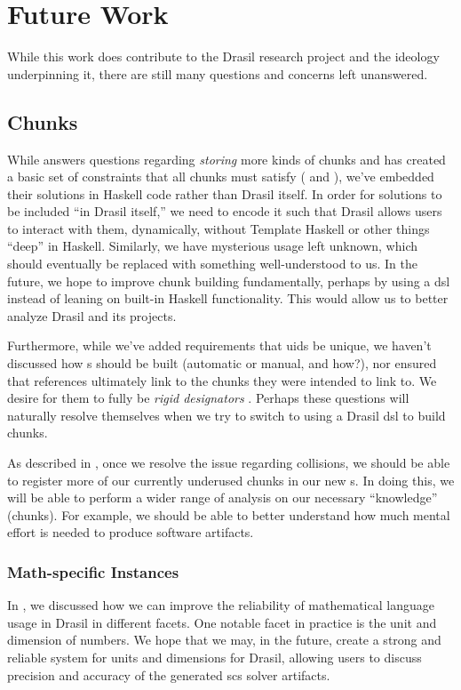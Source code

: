 \chapter{Future Work}
\label{chap:futureWork}


While this work does contribute to the Drasil research project and the ideology
underpinning it, there are still many questions and concerns left unanswered.

\section{Chunks}

While  answers questions regarding \textit{storing}
more kinds of chunks and has created a basic set of constraints that all chunks
must satisfy (\HasUID{} and \HasChunkRefs{}), we've embedded their solutions in
Haskell code rather than Drasil itself. In order for solutions to be included
``in Drasil itself,'' we need to encode it such that Drasil allows users to
interact with them, dynamically, without Template Haskell  or other things ``deep'' in Haskell. Similarly, we have
mysterious \Typeable{} usage left unknown, which should eventually be replaced
with something well-understood to us. In the future, we hope to improve chunk
building fundamentally, perhaps by using a \acs{dsl} instead of leaning on
built-in Haskell functionality. This would allow us to better analyze Drasil and
its projects.

Furthermore, while we've added requirements that \acsp{uid} be unique, we
haven't discussed how \UID{}s should be built (automatic or manual, and how?),
nor ensured that \UID{} references ultimately link to the chunks they were
intended to link to. We desire for them to fully be \textit{rigid designators}
. Perhaps these questions will
naturally resolve themselves when we try to switch to using a Drasil \acs{dsl}
to build chunks.

As described in , once we resolve the issue regarding
\UID{} collisions, we should be able to register more of our currently underused
chunks in our new \ChunkDB{}s. In doing this, we will be able to perform a wider
range of analysis on our necessary ``knowledge'' (chunks). For example, we
should be able to better understand how much mental effort is needed to produce
software artifacts.

\subsection{Math-specific Instances}

In , we discussed how we can improve the
reliability of mathematical language usage in Drasil in different facets. One
notable facet in practice is the unit and dimension of numbers. We hope that we
may, in the future, create a strong and reliable system for units and dimensions
for Drasil, allowing users to discuss precision and accuracy of the generated
\acs{scs} solver artifacts.

